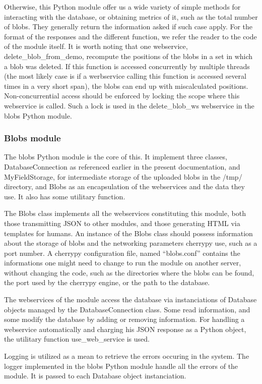 Otherwise, this Python module offer us a wide variety of simple methods for interacting with the database, or obtaining metrics of it, such as the total number of blobs. They generally return the information asked if such case apply. For the format of the responses and the different function, we refer the reader to the code of the module itself. It is worth noting that one webservice, delete\_blob\_from\_demo, recompute the positions of the blobs in a set in which a blob was deleted. If this function is accessed concurrently by multiple threads (the most likely case is if a werbservice calling this function is accessed several times in a very short span), the blobs can end up with miscalculated positions. Non-concurrential access should be enforced by locking the scope where this webservice is called. Such a lock is used in the delete\_blob\_ws webservice in the blobs Python module.

\subsubsection{Blobs module}
The blobs Python module is the core of this. It implement three classes, DatabaseConnection as referenced earlier in the present documentation, and MyFieldStorage, for intermediate storage of the uploaded blobs in the /tmp/ directory, and Blobs as an encapsulation of the webservices and the data they use. It also has some utilitary function.

The Blobs class implements all the webservices constituting this module, both those transmitting JSON to other modules, and those generating HTML via templates for humans. An instance of the Blobs class should possess information about the storage of blobs and the networking parameters cherrypy use, such as a port number. A cherrypy configuration file, named ``blobs.conf'' contains the informations one might need to change to run the module on another server, without changing the code, such as the directories where the blobs can be found, the port used by the cherrypy engine, or the path to the database.

The webservices of the module access the database via instanciations of Database objects managed by the DatabaseConnection class. Some read information, and some modify the database by adding or removing information. For handling a webservice automatically and charging his JSON response as a Python object, the utilitary function use\_web\_service is used.

Logging is utilized as a mean to retrieve the errors occuring in the system. The logger implemented in the blobs Python module handle all the errors of the module. It is passed to each Database object instanciation.


